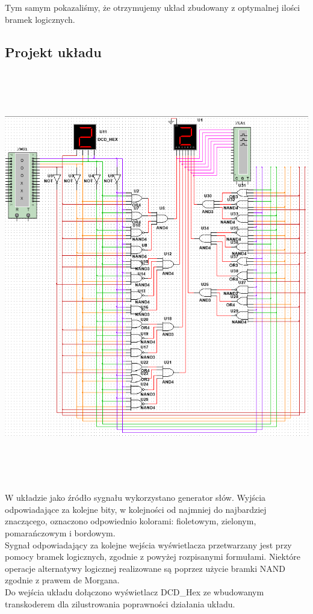 \documentclass{article}
\begin{document}
            Tym samym pokazaliśmy, że otrzymujemy układ zbudowany z optymalnej ilości bramek logicznych. 
        
        \subsection{Projekt układu}
            \begin{center}
                \includegraphics[height=18cm]{reports/img/Z1C_1.png}\\
            \end{center}
            W układzie jako źródło sygnału wykorzystano generator słów. Wyjścia odpowiadające za kolejne bity, w kolejności od najmniej do najbardziej znaczącego, oznaczono odpowiednio kolorami: fioletowym, zielonym, pomarańczowym i bordowym. \\
            Sygnał odpowiadający za kolejne wejścia wyświetlacza przetwarzany jest przy pomocy bramek logicznych, zgodnie z powyżej rozpisanymi formułami. Niektóre operacje alternatywy logicznej realizowane są poprzez użycie bramki NAND zgodnie z prawem de Morgana. \\
            Do wejścia układu dołączono wyświetlacz DCD\_Hex ze wbudowanym transkoderem dla zilustrowania poprawności działania układu.
        \newpage
\end{document}
